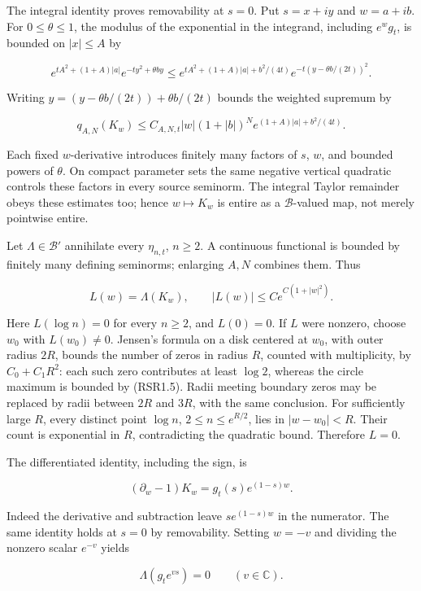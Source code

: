 The integral identity proves removability at \(s=0\). Put \(s=x+iy\) and
\(w=a+ib\). For \(0\le\theta\le1\), the modulus of the exponential in
the integrand, including \(e^wg_t\), is bounded on \(|x|\le A\) by

\[
e^{tA^2+(1+A)|a|}e^{-ty^2+\theta by}
\le e^{tA^2+(1+A)|a|+b^2/(4t)}
e^{-t(y-\theta b/(2t))^2}.
\tag{RSR1.3}
\]

Writing \(y=(y-\theta b/(2t))+\theta b/(2t)\) bounds the weighted
supremum by

\[
q_{A,N}(K_w)\le C_{A,N,t}|w|(1+|b|)^N
e^{(1+A)|a|+b^2/(4t)}.
\tag{RSR1.4}
\]

Each fixed \(w\)-derivative introduces finitely many factors of \(s\),
\(w\), and bounded powers of \(\theta\). On compact parameter sets the
same negative vertical quadratic controls these factors in every source
seminorm. The integral Taylor remainder obeys these estimates too; hence
\(w\mapsto K_w\) is entire as a \(\mathcal B\)-valued map, not merely
pointwise entire.

Let \(\Lambda\in\mathcal B'\) annihilate every \(\eta_{n,t}\),
\(n\ge2\). A continuous functional is bounded by finitely many defining
seminorms; enlarging \(A,N\) combines them. Thus

\[
L(w)=\Lambda(K_w),\qquad |L(w)|\le C e^{C(1+|w|^2)}.
\tag{RSR1.5}
\]

Here \(L(\log n)=0\) for every \(n\ge2\), and \(L(0)=0\). If \(L\) were
nonzero, choose \(w_0\) with \(L(w_0)\ne0\). Jensen's formula on a disk
centered at \(w_0\), with outer radius \(2R\), bounds the number of
zeros in radius \(R\), counted with multiplicity, by \(C_0+C_1R^2\):
each such zero contributes at least \(\log2\), whereas the circle
maximum is bounded by (RSR1.5). Radii meeting boundary zeros may be
replaced by radii between \(2R\) and \(3R\), with the same conclusion.
For sufficiently large \(R\), every distinct point \(\log n\),
\(2\le n\le e^{R/2}\), lies in \(|w-w_0|<R\). Their count is exponential
in \(R\), contradicting the quadratic bound. Therefore \(L=0\).

The differentiated identity, including the sign, is

\[
(\partial_w-1)K_w=g_t(s)e^{(1-s)w}.
\tag{RSR1.6}
\]

Indeed the derivative and subtraction leave \(s e^{(1-s)w}\) in the
numerator. The same identity holds at \(s=0\) by removability. Setting
\(w=-v\) and dividing the nonzero scalar \(e^{-v}\) yields

\[
\Lambda(g_te^{vs})=0\qquad(v\in\mathbb C).
\tag{RSR1.7}
\]

